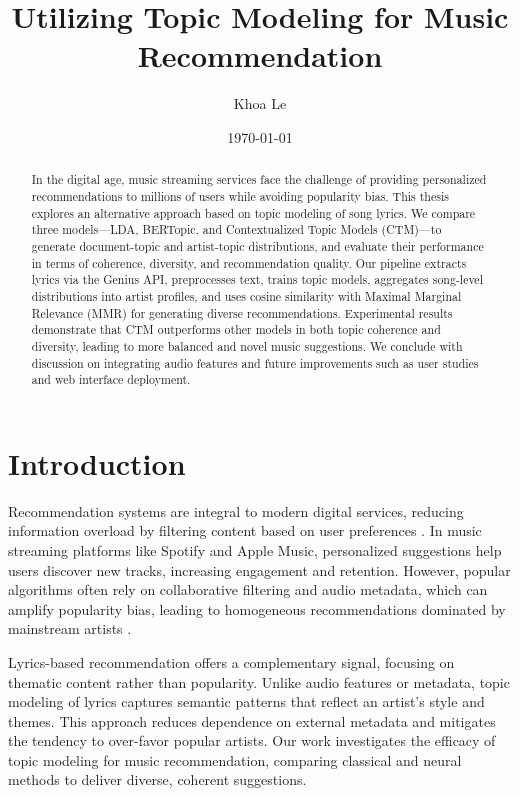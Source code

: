 \documentclass[12pt]{article}
\title{Utilizing Topic Modeling for Music Recommendation}
\author{Khoa Le}
\date{\today}
\begin{document}
\maketitle

\begin{abstract}
    In the digital age, music streaming services face the challenge of providing personalized recommendations to millions of users while avoiding popularity bias. This thesis explores an alternative approach based on topic modeling of song lyrics. We compare three models—LDA, BERTopic, and Contextualized Topic Models (CTM)—to generate document-topic and artist-topic distributions, and evaluate their performance in terms of coherence, diversity, and recommendation quality. Our pipeline extracts lyrics via the Genius API, preprocesses text, trains topic models, aggregates song-level distributions into artist profiles, and uses cosine similarity with Maximal Marginal Relevance (MMR) for generating diverse recommendations. Experimental results demonstrate that CTM outperforms other models in both topic coherence and diversity, leading to more balanced and novel music suggestions. We conclude with discussion on integrating audio features and future improvements such as user studies and web interface deployment.
\end{abstract}

\section{Introduction}
Recommendation systems are integral to modern digital services, reducing
information overload by filtering content based on user preferences
\cite{adomavicius2005toward}. In music streaming platforms like Spotify and
Apple Music, personalized suggestions help users discover new tracks,
increasing engagement and retention\cite{celma2010music}. However, popular
algorithms often rely on collaborative filtering and audio metadata, which can
amplify popularity bias, leading to homogeneous recommendations dominated by
mainstream artists \cite{abdollahpouri2019unfairness}.

Lyrics-based recommendation offers a complementary signal, focusing on thematic
content rather than popularity. Unlike audio features or metadata, topic
modeling of lyrics captures semantic patterns that reflect an artist's style
and themes. This approach reduces dependence on external metadata and mitigates
the tendency to over-favor popular artists. Our work investigates the efficacy
of topic modeling for music recommendation, comparing classical and neural
methods to deliver diverse, coherent suggestions.
\end{document}
